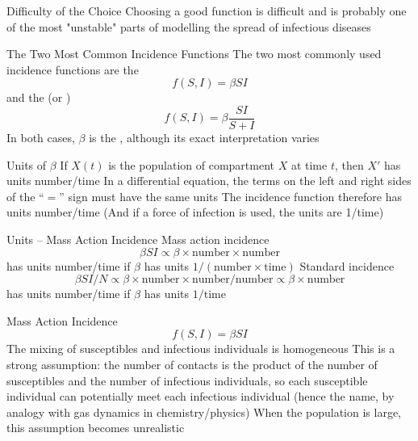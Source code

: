 \documentclass[aspectratio=169]{beamer}\usepackage[]{graphicx}\usepackage[]{xcolor}
\begin{document}
\begin{frame}{Difficulty of the Choice}
\bbullet Choosing a good function is difficult and is probably one of the most "unstable" parts of modelling the spread of infectious diseases
\end{frame}

\begin{frame}{The Two Most Common Incidence Functions}
\bbullet The two most commonly used incidence functions are the 
\begin{equation}
\tag{2}
f(S,I)=\beta SI
\end{equation}
and the  (or )
\begin{equation}
\tag{3}
f(S,I)=\beta\frac{SI}{S+I}
\end{equation}
\vfill
\bbullet In both cases, $\beta$ is the , although its exact interpretation varies
\end{frame}

\begin{frame}{Units of $\beta$}
\bbullet If $X(t)$ is the population of compartment $X$ at time $t$, then $X'$ has units number/time
\vfill
\bbullet In a differential equation, the terms on the left and right sides of the ``$=$'' sign must have the same units
\vfill
\bbullet The incidence function therefore has units number/time
\vfill
\bbullet (And if a force of infection is used, the units are 1/time)
\end{frame}

\begin{frame}{Units -- Mass Action Incidence}
\bbullet Mass action incidence
\[
\beta SI \propto 
\beta\times\text{number}\times\text{number}
\]
has units number/time if $\beta$ has units $1/(\text{number}\times\text{time})$
\vfill
\bbullet Standard incidence
\[
\beta SI/N \propto 
\beta\times\text{number}\times\text{number}/\text{number} \propto \beta \times \text{number}
\]
has units number/time if $\beta$ has units $1/\text{time}$
\end{frame}

\begin{frame}{Mass Action Incidence}
\begin{equation}
\tag{2}\label{eq:incidence_mass_action}
f(S,I)=\beta SI
\end{equation}
\bbullet The mixing of susceptibles and infectious individuals is homogeneous 
\vfill
\bbullet This is a strong assumption: the number of contacts is the product of the number of susceptibles and the number of infectious individuals, so each susceptible individual can potentially meet each infectious individual
\vfill
\bbullet (hence the name, by analogy with gas dynamics in chemistry/physics) 
\vfill
\bbullet When the population is large, this assumption becomes unrealistic
\end{frame}
\end{document}
